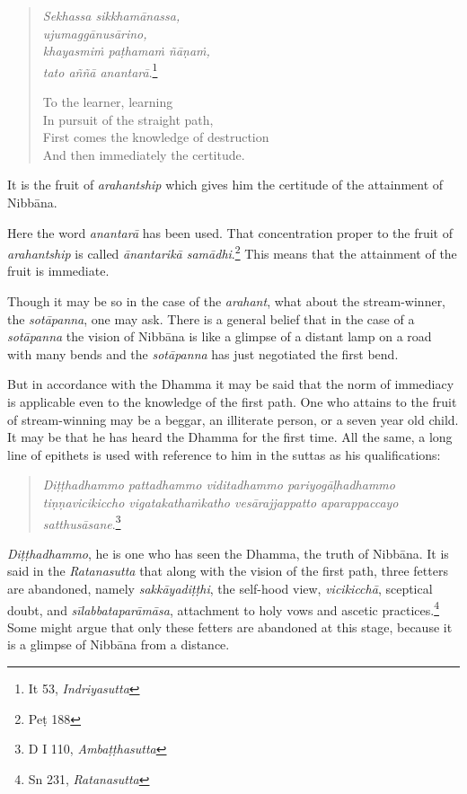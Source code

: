 \begin{quote}
\emph{Sekhassa sikkhamānassa,}\\
\emph{ujumaggānusārino,}\\
\emph{khayasmiṁ paṭhamaṁ ñāṇaṁ,}\\
\emph{tato aññā anantarā}.\footnote{It 53, \emph{Indriyasutta}}

To the learner, learning\\
In pursuit of the straight path,\\
First comes the knowledge of destruction\\
And then immediately the certitude.
\end{quote}

It is the fruit of \emph{arahantship} which gives him the certitude of the attainment of Nibbāna.

Here the word \emph{anantarā} has been used. That concentration proper to the fruit of \emph{arahantship} is called \emph{ānantarikā samādhi}.\footnote{Peṭ 188} This means that the attainment of the fruit is immediate.

Though it may be so in the case of the \emph{arahant}, what about the stream-winner, the \emph{sotāpanna}, one may ask. There is a general belief that in the case of a \emph{sotāpanna} the vision of Nibbāna is like a glimpse of a distant lamp on a road with many bends and the \emph{sotāpanna} has just negotiated the first bend.

But in accordance with the Dhamma it may be said that the norm of immediacy is applicable even to the knowledge of the first path. One who attains to the fruit of stream-winning may be a beggar, an illiterate person, or a seven year old child. It may be that he has heard the Dhamma for the first time. All the same, a long line of epithets is used with reference to him in the suttas as his qualifications:

\begin{quote}
\emph{Diṭṭhadhammo pattadhammo viditadhammo pariyogāḷhadhammo tiṇṇavicikiccho vigatakathaṁkatho vesārajjappatto aparappaccayo satthusāsane}.\footnote{D I 110, \emph{Ambaṭṭhasutta}}
\end{quote}

\emph{Diṭṭhadhammo}, he is one who has seen the Dhamma, the truth of Nibbāna. It is said in the \emph{Ratanasutta} that along with the vision of the first path, three fetters are abandoned, namely \emph{sakkāyadiṭṭhi}, the self-hood view, \emph{vicikicchā}, sceptical doubt, and \emph{sīlabbataparāmāsa}, attachment to holy vows and ascetic practices.\footnote{Sn 231, \emph{Ratanasutta}} Some might argue that only these fetters are abandoned at this stage, because it is a glimpse of Nibbāna from a distance.

